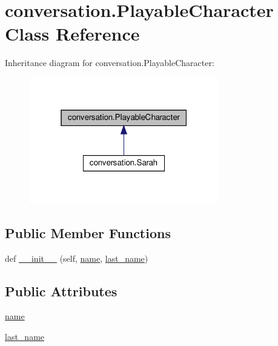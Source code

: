 \hypertarget{classconversation_1_1PlayableCharacter}{}\section{conversation.\+Playable\+Character Class Reference}
\label{classconversation_1_1PlayableCharacter}


Inheritance diagram for conversation.\+Playable\+Character\+:\nopagebreak
\begin{figure}[H]
\begin{center}
\leavevmode
\includegraphics[width=235pt]{classconversation_1_1PlayableCharacter__inherit__graph}
\end{center}
\end{figure}
\subsection*{Public Member Functions}
\begin{DoxyCompactItemize}
\item 
def \hyperlink{classconversation_1_1PlayableCharacter_ab550484757f5b3f56f7181a5c8c82ec2}{\+\_\+\+\_\+init\+\_\+\+\_\+} (self, \hyperlink{classconversation_1_1PlayableCharacter_aae453fd97ea226b02f342fe915653d87}{name}, \hyperlink{classconversation_1_1PlayableCharacter_a48e6d5c99c0b2a301a6eb84d41078229}{last\+\_\+name})
\end{DoxyCompactItemize}
\subsection*{Public Attributes}
\begin{DoxyCompactItemize}
\item 
\hyperlink{classconversation_1_1PlayableCharacter_aae453fd97ea226b02f342fe915653d87}{name}
\item 
\hyperlink{classconversation_1_1PlayableCharacter_a48e6d5c99c0b2a301a6eb84d41078229}{last\+\_\+name}
\end{DoxyCompactItemize}


